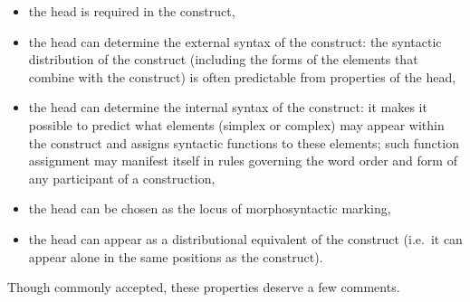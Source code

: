 \documentclass[output=paper,nobabel,draftmode  ,colorlinks, citecolor=brown]{langscibook}
\begin{document}
\begin{itemize}
    \item the head is required in the construct,\footnotemark
    \item the head can determine the external syntax of the construct: the syntactic distribution of the construct (including the forms of the elements that combine with the construct) is often predictable from properties of the head,
    \item the head can determine the internal syntax of the construct: it makes it possible to predict what elements (simplex or complex) may appear within the construct and assigns syntactic functions to these elements; such function assignment may manifest itself in rules governing the word order and form of any participant of a construction,
    \item the head can be chosen as the locus of morphosyntactic marking,
    \item the head can appear as a distributional equivalent of the construct (i.e.\ it can appear alone in the same positions as the construct).
\end{itemize}

\noindent
Though commonly accepted, these properties deserve a few comments. 
\end{document}
